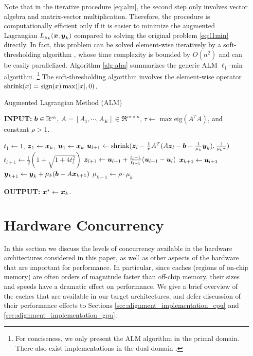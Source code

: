 \documentclass[preprint]{sigplanconf}
\begin{document}
Note that in the iterative procedure \eqref{eq:alm}, the second
step only involves vector algebra and matrix-vector multiplication. Therefore,
the procedure is computationally efficient only if it is easier to minimize the
augmented Lagrangian $L_{\mu_k} ({\boldsymbol{x}},{\boldsymbol{y}}_k)$ compared to solving the original problem
\eqref{eq:l1min} directly. In fact, this problem can be solved element-wise
iteratively by a soft-thresholding algorithm \cite{WrightS2008,BeckA2009},
whose time complexity is bounded by $O(n^2)$ and can be easily parallelized.
Algorithm \ref{alg:alm} summarizes the generic ALM $\ell_1$-min algorithm. \footnote{For conciseness, we
only present the ALM algorithm in the primal domain. There also
exist implementations in the dual domain \cite{YangJ2009,YangA2010-ICIP}.}
The soft-thresholding algorithm involves the element-wise operator ${\text{shrink}}(x) = {\text{sign}}(x)\max(|x|,0)$.

 \begin{algorithm}[h]
\caption{Augmented Lagrangian Method (ALM)}
\small
{\bf INPUT:} ${\boldsymbol{b}} \in {\mathbb{R}}^m$, $A=[A_1,\cdots, A_K] \in \Re^{m \times n}$, $\tau\leftarrow \max\mbox{eig}(A^TA)$, and constant $\rho>1$.
\begin{algorithmic}[1]
\STATE $t_1 \leftarrow 1$, ${\boldsymbol{z}}_1 \leftarrow {\boldsymbol{x}}_k$, ${\boldsymbol{u}}_1 \leftarrow {\boldsymbol{x}}_k$ 
\STATE ${\boldsymbol{u}}_{l+1}  \leftarrow {\text{shrink}}({\boldsymbol{z}}_l - \frac{1}{\tau}A^T(A{\boldsymbol{z}}_l - {\boldsymbol{b}} - \frac{1}{\mu_k}{\boldsymbol{y}}_k), \frac{1}{\mu_k\tau})$
\STATE $t_{l+1} \leftarrow \frac{1}{2}( 1 + \sqrt{1+4t_l^2})$
\STATE ${\boldsymbol{z}}_{l+1} \leftarrow {\boldsymbol{u}}_{l+1}+ \frac{t_l - 1}{t_{l+1}}({\boldsymbol{u}}_{l+1} - {\boldsymbol{u}}_l)$ 
\ENDWHILE 
\STATE ${\boldsymbol{x}}_{k+1} \leftarrow {\boldsymbol{u}}_{l+1}$ 
\STATE ${\boldsymbol{y}}_{k+1} \leftarrow {\boldsymbol{y}}_k + \mu_k ({\boldsymbol{b}} - A{\boldsymbol{x}}_{k+1})$ 
\STATE $\mu_{k+1} \leftarrow \rho\cdot\mu_k$ 
\ENDWHILE 
\end{algorithmic}

{\bf OUTPUT:} ${\boldsymbol{x}}^* \leftarrow {\boldsymbol{x}}_k$.
\label{alg:alm} 
\end{algorithm}

\section{Hardware Concurrency} \label{sec:concurrency}
In this section we discuss the levels of concurrency available in the hardware
architectures considered in this paper, as well as other aspects of the
hardware that are important for performance.  In particular, since caches
(regions of on-chip memory) are often orders of magnitude faster than off-chip
memory, their sizes and speeds have a dramatic effect on performance.  We give a
brief overview of the caches that are available in our target architectures,
and defer discussion of their performance effects to Sections
\ref{sec:alignment_implementation_cpu} and
\ref{sec:alignment_implementation_gpu}.
\end{document}
